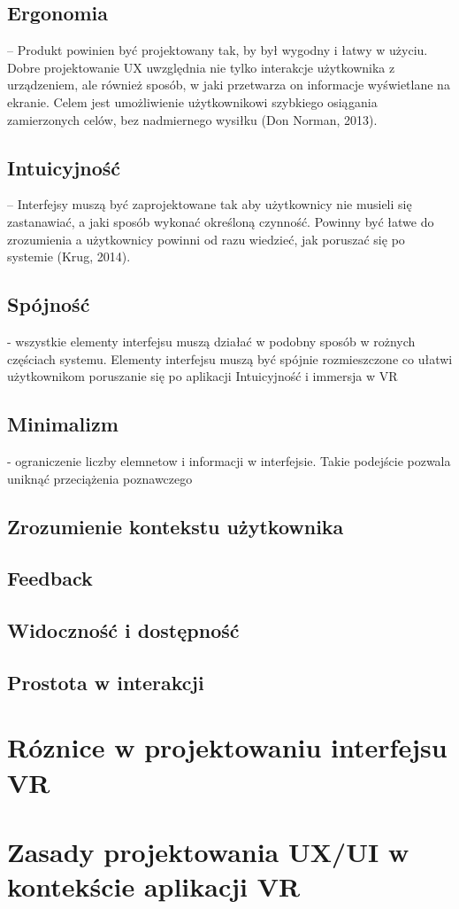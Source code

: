 \subsection{Ergonomia} – Produkt powinien być projektowany tak, by był wygodny i łatwy w użyciu. Dobre projektowanie UX uwzględnia nie tylko interakcje użytkownika z urządzeniem, ale również sposób, w jaki przetwarza on informacje wyświetlane na ekranie. Celem jest umożliwienie użytkownikowi szybkiego osiągania zamierzonych celów, bez nadmiernego wysiłku (Don Norman, 2013).

\subsection{Intuicyjność} – Interfejsy muszą być zaprojektowane tak aby użytkownicy nie musieli się zastanawiać, a jaki sposób wykonać określoną czynność. Powinny być łatwe do zrozumienia a użytkownicy powinni od razu wiedzieć, jak poruszać się po systemie (Krug, 2014).

\subsection{Spójność} - wszystkie elementy interfejsu muszą działać w podobny sposób w rożnych częściach systemu. Elementy interfejsu muszą być spójnie rozmieszczone co ułatwi użytkownikom poruszanie się po aplikacji
Intuicyjność i immersja w VR

\subsection{Minimalizm} - ograniczenie liczby elemnetow i informacji w interfejsie. Takie podejście pozwala uniknąć przeciążenia poznawczego


\subsection{Zrozumienie kontekstu użytkownika}

\subsection{Feedback}

\subsection{Widoczność i dostępność}

\subsection{Prostota w interakcji}

\section{Róznice w projektowaniu interfejsu VR}
\section{Zasady  projektowania UX/UI w kontekście aplikacji VR}